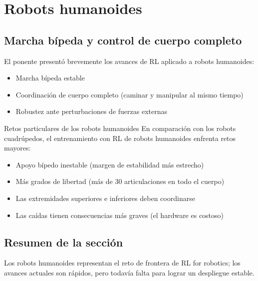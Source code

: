 \section{Robots humanoides}

\subsection{Marcha bípeda y control de cuerpo completo}

El ponente presentó brevemente los avances de RL aplicado a robots humanoides:
\begin{itemize}
    \item Marcha bípeda estable
    \item Coordinación de cuerpo completo (caminar y manipular al mismo tiempo)
    \item Robustez ante perturbaciones de fuerzas externas
\end{itemize}

\begin{knowledgebox}{Retos particulares de los robots humanoides}
En comparación con los robots cuadrúpedos, el entrenamiento con RL de robots humanoides enfrenta retos mayores:
\begin{itemize}
    \item Apoyo bípedo inestable (margen de estabilidad más estrecho)
    \item Más grados de libertad (más de 30 articulaciones en todo el cuerpo)
    \item Las extremidades superiores e inferiores deben coordinarse
    \item Las caídas tienen consecuencias más graves (el hardware es costoso)
\end{itemize}
\end{knowledgebox}

\subsection{Resumen de la sección}

Los robots humanoides representan el reto de frontera de RL for robotics; los avances actuales son rápidos, pero todavía falta para lograr un despliegue estable.
